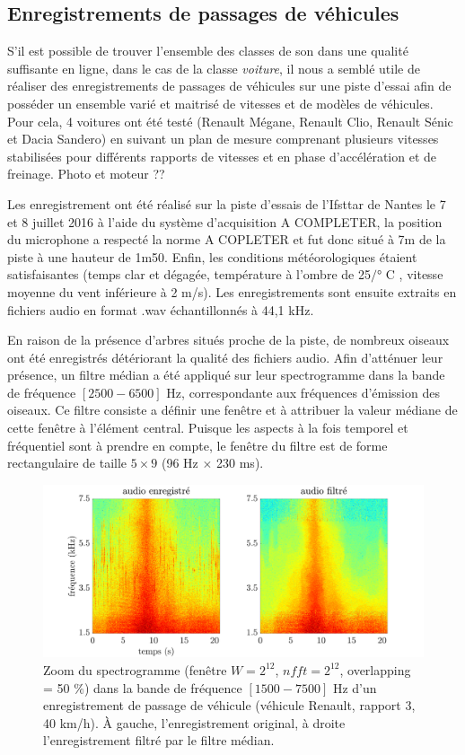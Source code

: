 \subsection{Enregistrements de passages de véhicules}
S'il est possible de trouver l'ensemble des classes de son dans une qualité suffisante en ligne, dans le cas de la classe \textit{voiture}, il nous a semblé utile de réaliser des enregistrements de passages de véhicules sur une piste d'essai afin de posséder un ensemble varié et maitrisé de vitesses et de modèles de véhicules. Pour cela, 4 voitures ont été testé (Renault Mégane, Renault Clio, Renault Sénic et Dacia Sandero) en suivant un plan de mesure comprenant plusieurs vitesses stabilisées pour différents rapports de vitesses et en phase d'accélération et de freinage.
Photo et moteur ??



Les enregistrement ont été réalisé sur la piste d'essais de l'Ifsttar de Nantes le 7 et 8 juillet 2016 à l'aide du système d'acquisition A COMPLETER, la position du microphone a respecté la norme A COPLETER et fut donc situé à 7m de la piste à une hauteur de 1m50. Enfin, les conditions météorologiques étaient satisfaisantes (temps clar et dégagée, température à l'ombre de 25$/°$ C , vitesse moyenne du vent inférieure à 2 m/s). Les enregistrements sont ensuite extraits en fichiers audio en format .wav échantillonnés à 44,1 kHz.
 
En raison de la présence d'arbres situés proche de la piste, de nombreux oiseaux ont été enregistrés détériorant la qualité des fichiers audio. Afin d'atténuer leur présence, un filtre médian a été appliqué sur leur spectrogramme \cite{fitzgerald_drum_2010} dans la bande de fréquence $\left[2500 - 6500\right]$ Hz, correspondante aux fréquences d'émission des oiseaux. Ce filtre consiste a définir une fenêtre et à attribuer la valeur médiane de cette fenêtre à l'élément central. Puisque les aspects à la fois temporel et fréquentiel sont à prendre en compte, le fenêtre du filtre est de forme rectangulaire de taille $5 \times 9$ (96 Hz $\times$ 230 ms).\\

\begin{figure}[hbtp]
\centering
\includegraphics[width=.9\textwidth]{./figures/autres/filtrageMedian_VL1_R3_40_FR.pdf}
\caption{Zoom du spectrogramme (fenêtre $W = 2^{12}$, $nfft = 2^{12}$, overlapping = 50 $\%$) dans la bande de fréquence $\left[1500-7500 \right]$ Hz d'un enregistrement de passage de véhicule (véhicule Renault, rapport 3, 40 km/h). \`A gauche, l'enregistrement original, à droite l'enregistrement filtré par le filtre médian.}
\end{figure}


